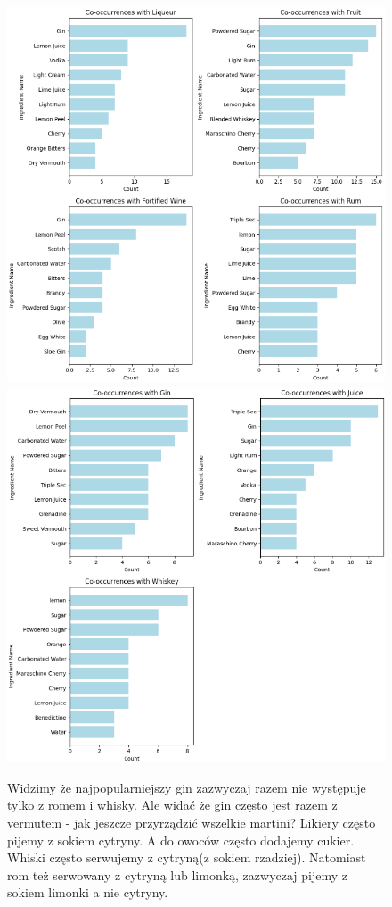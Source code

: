 \documentclass{article}
\begin{document}
\begin{figure}[h]
\centering
    \includegraphics[width=0.6\linewidth]{i_p_3.png}
    \vspace{2cm}
    \includegraphics[width=0.6\linewidth]{i_p_4.png}
    \caption{Widzimy że najpopularniejszy gin zazwyczaj razem nie występuje tylko z romem i whisky. Ale widać że gin często jest razem z vermutem - jak jeszcze przyrządzić wszelkie martini? Likiery często pijemy z sokiem cytryny. A do owoców często dodajemy cukier. Whiski często serwujemy z cytryną(z sokiem rzadziej). Natomiast rom też serwowany z cytryną lub limonką, zazwyczaj pijemy z sokiem limonki a nie cytryny.}
\end{figure}


\clearpage
\end{document}
